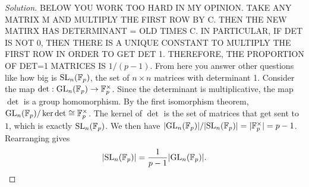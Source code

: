 \documentclass[11pt,letterpaper]{report}
\newcommand{\field}{\mathbb{F}}
\theoremstyle{definition}
\theoremstyle{remark}
\newenvironment{solution}
{\begin{proof}[Solution]}
{\end{proof}}
\begin{document}
\begin{solution}
BELOW YOU WORK TOO HARD IN MY OPINION. TAKE ANY MATRIX M AND MULTIPLY THE FIRST ROW BY C. THEN THE NEW MATIRX HAS DETERMINANT = OLD TIMES C. IN PARTICULAR, IF DET IS NOT 0, THEN THERE IS A UNIQUE CONSTANT TO MULTIPLY THE FIRST ROW IN ORDER TO GET DET 1. THEREFORE, THE PROPORTION OF DET=1 MATRICES IS $ 1/(p-1)$.
	\noindent From here you answer other questions like how big is $\SL_n(\field_p)$, the set of $n\times n$ matrices with determinant 1. Consider the map $\det: \GL_n(\field_p)\to \field_p^\times$. Since the determinant is multiplicative, the map $\det$ is a group homomorphism. By the first isomorphism theorem, $\GL_n(\field_p)/\ker \det \cong \field_p^\times$. The kernel of $\det$ is the set of matrices that get sent to $1$, which is exactly $\SL_n(\field_p)$. We then have $|\GL_n(\field_p)|/|\SL_n(\field_p)| = |\field_p^\times| = p-1$. Rearranging gives
	\[
	|\SL_n(\field_p)| = \frac{1}{p-1}|\GL_n(\field_p)|.
	\]
\end{solution}
\end{document}
